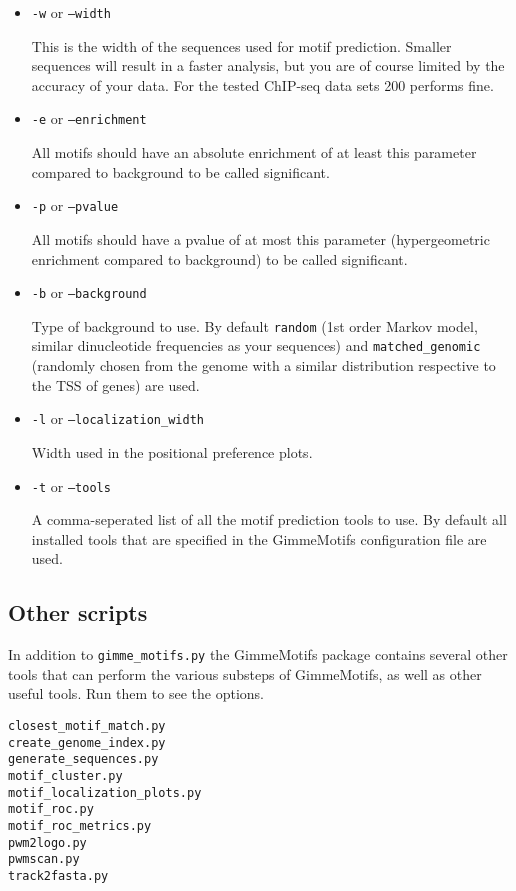 \documentclass[10pt]{article}
\begin{document}
\begin{itemize}
\item 
\texttt{-w} or \texttt{--width}

This is the width of the sequences used for motif prediction. Smaller sequences will result in a faster analysis, but you are of course limited by the accuracy of your data. For the tested ChIP-seq data sets 200 performs fine.

\item 
\texttt{-e} or \texttt{--enrichment}

All motifs should have an absolute enrichment of at least this parameter compared to background to be called significant.

\item 
\texttt{-p} or \texttt{--pvalue}

All motifs should have a pvalue of at most this parameter (hypergeometric enrichment compared to background) to be called significant.

\item 
\texttt{-b} or \texttt{--background}

Type of background to use. By default \texttt{random} (1st order Markov model, similar dinucleotide frequencies as your sequences) and \texttt{matched\_genomic} (randomly chosen from the genome with a similar distribution respective to the TSS of genes) are used.

\item 
\texttt{-l} or \texttt{--localization\_width}

Width used in the positional preference plots.

\item 
\texttt{-t} or \texttt{--tools}

A comma-seperated list of all the motif prediction tools to use. By default all installed tools that are specified in the GimmeMotifs configuration file are used.
\end{itemize}

\subsection{Other scripts}
In addition to \texttt{gimme\_motifs.py} the GimmeMotifs package contains several other tools that can perform the various substeps of GimmeMotifs, as well as other useful tools. Run them to see the options.

\begin{verbatim}
closest_motif_match.py
create_genome_index.py
generate_sequences.py
motif_cluster.py
motif_localization_plots.py
motif_roc.py
motif_roc_metrics.py
pwm2logo.py
pwmscan.py
track2fasta.py 
\end{verbatim}
\end{document}

